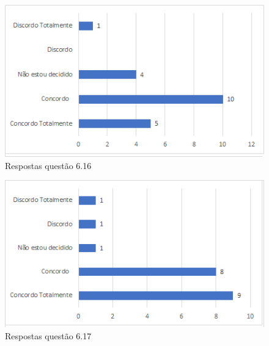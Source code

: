 \begin{figure}[!t]
\centering
\includegraphics[scale=0.7]{figuras das questoes/6.16.png}
\caption{Respostas questão 6.16}
\end{figure}

\begin{figure}[!t]
\centering
\includegraphics[scale=0.7]{figuras das questoes/6.17.png}
\caption{Respostas questão 6.17}
\end{figure}
\begin{itemize}
\end{itemize}


 

 

 
